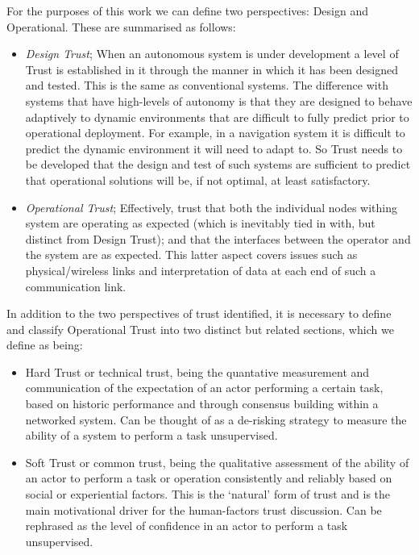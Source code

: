 \documentclass[runningheads,a4paper]{llncs}
\begin{document}
For the purposes of this work we can define two perspectives: Design and Operational. These are summarised as follows:

\begin{itemize}
  \item \emph{Design Trust}; When an autonomous system is under development a level of Trust is established in it through the manner in which it has been designed and tested. This is the same as conventional systems. The difference with systems that have high-levels of autonomy is that they are designed to behave adaptively to dynamic environments that are difficult to fully predict prior to operational deployment. For example, in a navigation system it is difficult to predict the dynamic environment it will need to adapt to. So Trust needs to be developed that the design and test of such systems are sufficient to predict that operational solutions will be, if not optimal, at least satisfactory.

  \item \emph{Operational Trust}; Effectively, trust that both the individual nodes withing system are operating as expected (which is inevitably tied in with, but distinct from Design Trust); and that the interfaces between the operator and the system are as expected. This latter aspect covers issues such as physical/wireless links and interpretation of data at each end of such a communication link.
\end{itemize}

In addition to the two perspectives of trust identified, it is necessary to define and classify Operational Trust into two distinct but related sections, which we define as being:
\begin{itemize}
  \item Hard Trust or technical trust, being the quantative measurement and communication of the expectation of an actor performing a certain task, based on historic performance and through consensus building within a networked system. Can be thought of as a de-risking strategy to measure the ability of a system to perform a task unsupervised.
  \item Soft Trust or common trust, being the qualitative assessment of the ability of an actor to perform a task or operation consistently and reliably based on social or experiential factors. This is the ‘natural’ form of trust and is the main motivational driver for the human-factors trust discussion. Can be rephrased as the level of confidence in an actor to perform a task unsupervised.
\end{itemize} 
\end{document}

